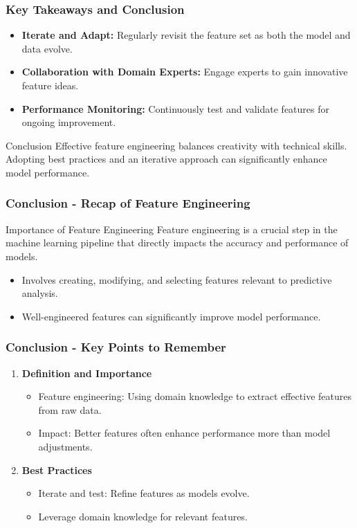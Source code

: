 \documentclass[aspectratio=169]{beamer}
\begin{document}
\begin{frame}
    \frametitle{Key Takeaways and Conclusion}
    \begin{itemize}
        \item \textbf{Iterate and Adapt:} Regularly revisit the feature set as both the model and data evolve.
        \item \textbf{Collaboration with Domain Experts:} Engage experts to gain innovative feature ideas.
        \item \textbf{Performance Monitoring:} Continuously test and validate features for ongoing improvement.
    \end{itemize}

    \begin{block}{Conclusion}
        Effective feature engineering balances creativity with technical skills. Adopting best practices and an iterative approach can significantly enhance model performance.
    \end{block}
\end{frame}

\begin{frame}[fragile]
    \frametitle{Conclusion - Recap of Feature Engineering}
    \begin{block}{Importance of Feature Engineering}
        Feature engineering is a crucial step in the machine learning pipeline that directly impacts the accuracy and performance of models.
    \end{block}
    \begin{itemize}
        \item Involves creating, modifying, and selecting features relevant to predictive analysis.
        \item Well-engineered features can significantly improve model performance.
    \end{itemize}
\end{frame}

\begin{frame}[fragile]
    \frametitle{Conclusion - Key Points to Remember}
    \begin{enumerate}
        \item \textbf{Definition and Importance}
        \begin{itemize}
            \item Feature engineering: Using domain knowledge to extract effective features from raw data.
            \item Impact: Better features often enhance performance more than model adjustments.
        \end{itemize}

        \item \textbf{Best Practices}
        \begin{itemize}
            \item Iterate and test: Refine features as models evolve.
            \item Leverage domain knowledge for relevant features.
        \end{itemize}
    \end{enumerate}
\end{frame}
\end{document}
